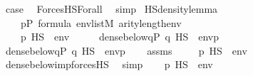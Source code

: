 \begin{isabellebody}
\ {\isacharquery}{\kern0pt}case\ \isamarkupfalse%
\ ForcesHS{\isacharunderscore}{\kern0pt}Forall\ \isamarkupfalse%
\ simp\isanewline
{}\isamarkupfalse%
%
\endisatagproof
{\isafoldproof}%
%
\isadelimproof
\isanewline
%
\endisadelimproof
\isanewline
{}\isamarkupfalse%
\ HS{\isacharunderscore}{\kern0pt}density{\isacharunderscore}{\kern0pt}lemma{\isacharcolon}{\kern0pt}\isanewline
\ \ \isanewline
\ \ \ \ {\isachardoublequoteopen}p{\isasymin}P{\isachardoublequoteclose}\ {\isachardoublequoteopen}{\isasymphi}{\isasymin}formula{\isachardoublequoteclose}\ {\isachardoublequoteopen}env{\isasymin}list{\isacharparenleft}{\kern0pt}M{\isacharparenright}{\kern0pt}{\isachardoublequoteclose}\ {\isachardoublequoteopen}arity{\isacharparenleft}{\kern0pt}{\isasymphi}{\isacharparenright}{\kern0pt}{\isasymle}length{\isacharparenleft}{\kern0pt}env{\isacharparenright}{\kern0pt}{\isachardoublequoteclose}\isanewline
\ \ \isanewline
\ \ \ \ {\isachardoublequoteopen}p\ {\isasymtturnstile}HS\ {\isasymphi}\ env\ \ \ {\isasymlongleftrightarrow}\ \ \ dense{\isacharunderscore}{\kern0pt}below{\isacharparenleft}{\kern0pt}{\isacharbraceleft}{\kern0pt}q{\isasymin}P{\isachardot}{\kern0pt}\ {\isacharparenleft}{\kern0pt}q\ {\isasymtturnstile}HS\ {\isasymphi}\ env{\isacharparenright}{\kern0pt}{\isacharbraceright}{\kern0pt}{\isacharcomma}{\kern0pt}p{\isacharparenright}{\kern0pt}{\isachardoublequoteclose}\isanewline
%
\isadelimproof
%
\endisadelimproof
%
\isatagproof
{}\isamarkupfalse%
\isanewline
\ \ \isamarkupfalse%
\ {\isachardoublequoteopen}dense{\isacharunderscore}{\kern0pt}below{\isacharparenleft}{\kern0pt}{\isacharbraceleft}{\kern0pt}q{\isasymin}P{\isachardot}{\kern0pt}\ {\isacharparenleft}{\kern0pt}q\ {\isasymtturnstile}HS\ {\isasymphi}\ env{\isacharparenright}{\kern0pt}{\isacharbraceright}{\kern0pt}{\isacharcomma}{\kern0pt}p{\isacharparenright}{\kern0pt}{\isachardoublequoteclose}\isanewline
\ \ \isamarkupfalse%
\ assms\isanewline
\ \ \isamarkupfalse%
\ \ {\isachardoublequoteopen}{\isacharparenleft}{\kern0pt}p\ {\isasymtturnstile}HS\ {\isasymphi}\ env{\isacharparenright}{\kern0pt}{\isachardoublequoteclose}\isanewline
\ \ \ \ \isamarkupfalse%
\ dense{\isacharunderscore}{\kern0pt}below{\isacharunderscore}{\kern0pt}imp{\isacharunderscore}{\kern0pt}forcesHS\ \isamarkupfalse%
\ simp\isanewline
{}\isamarkupfalse%
\isanewline
\ \ \isamarkupfalse%
\ {\isachardoublequoteopen}p\ {\isasymtturnstile}HS\ {\isasymphi}\ env{\isachardoublequoteclose}\isanewline

\end{isabellebody}
